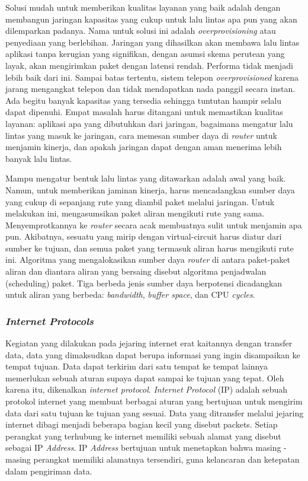 Solusi mudah untuk memberikan kualitas layanan yang baik adalah dengan membangun jaringan kapasitas yang cukup untuk lalu lintas apa pun yang akan dilemparkan padanya. Nama untuk solusi ini adalah \emph{overprovisioning} atau penyediaan yang berlebihan. Jaringan yang dihasilkan akan membawa lalu lintas aplikasi tanpa kerugian yang signifikan, dengan asumsi skema perutean yang layak, akan mengirimkan paket dengan latensi rendah. Performa tidak menjadi lebih baik dari ini. Sampai batas tertentu, sistem telepon \emph{overprovisioned} karena jarang mengangkat telepon dan tidak mendapatkan nada panggil secara instan. Ada begitu banyak kapasitas yang tersedia sehingga tuntutan hampir selalu dapat dipenuhi. Empat masalah harus ditangani untuk memastikan kualitas layanan: aplikasi apa yang dibutuhkan dari jaringan, bagaimana mengatur lalu lintas yang masuk ke jaringan, cara memesan sumber daya di \emph{router} untuk menjamin kinerja, dan apakah jaringan dapat dengan aman menerima lebih banyak lalu lintas. 

Mampu mengatur bentuk lalu lintas yang ditawarkan adalah awal yang baik. Namun, untuk memberikan jaminan kinerja, harus mencadangkan sumber daya yang cukup di sepanjang rute yang diambil paket melalui jaringan. Untuk melakukan ini, mengasumsikan paket aliran mengikuti rute yang sama. Menyemprotkannya ke \emph{router} secara acak membuatnya sulit untuk menjamin apa pun. Akibatnya, sesuatu yang mirip dengan virtual-circuit harus diatur dari sumber ke tujuan, dan semua paket yang termasuk aliran harus mengikuti rute ini. Algoritma yang mengalokasikan sumber daya \emph{router} di antara paket-paket aliran dan diantara aliran yang bersaing disebut algoritma penjadwalan (scheduling) paket. Tiga berbeda jenis sumber daya berpotensi dicadangkan untuk aliran yang berbeda: \emph{bandwidth}, \emph{buffer space}, dan CPU \emph{cycles}.

\subsubsection{\emph{Internet Protocols}}

Kegiatan yang dilakukan pada jejaring internet erat kaitannya dengan transfer data, data yang dimaksudkan dapat berupa informasi yang ingin disampaikan ke tempat tujuan. Data dapat terkirim dari satu tempat ke tempat lainnya memerlukan sebuah aturan supaya dapat sampai ke tujuan yang tepat. Oleh karena itu, dikenalkan \emph{internet protocol}. \emph{Internet Protocol} (IP) adalah sebuah protokol internet yang membuat berbagai aturan yang bertujuan untuk mengirim data dari satu tujuan ke tujuan yang sesuai. Data yang ditransfer melalui jejaring internet dibagi menjadi beberapa bagian kecil yang disebut packets. Setiap perangkat yang terhubung ke internet memiliki sebuah alamat yang disebut sebagai IP \emph{Address}. IP \emph{Address} bertujuan untuk menetapkan bahwa masing - masing perangkat memiliki alamatnya tersendiri, guna kelancaran dan ketepatan dalam pengiriman data.

